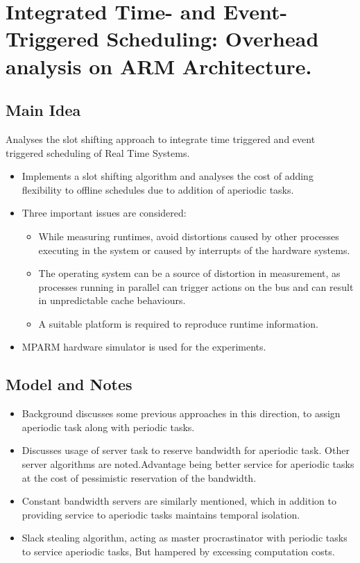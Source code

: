 \section{Integrated Time- and Event-Triggered Scheduling: Overhead analysis on ARM Architecture.}
\subsection*{Main Idea}
Analyses the slot shifting approach to integrate time triggered and event triggered scheduling of Real Time Systems.
\begin{itemize}
	\item Implements a slot shifting algorithm and analyses the cost of adding flexibility to offline schedules due to addition of aperiodic tasks.
	\item Three important issues are considered: 
	\begin{itemize}
		\item While measuring runtimes, avoid distortions caused by other processes executing in the system or caused by interrupts of the hardware systems.
		\item The operating system can be a source of distortion in measurement, as processes running in parallel can trigger actions on the bus and can result in unpredictable cache behaviours.
		\item A suitable platform is required to reproduce runtime information.
	\end{itemize}
	\item MPARM hardware simulator is used for the experiments.
\end{itemize}
\subsection*{Model and Notes}
\begin{itemize}
	\item Background discusses some previous approaches in this direction, to assign aperiodic task along with periodic tasks.
	\item Discusses usage of server task to reserve bandwidth for aperiodic task. Other server algorithms are noted.Advantage being better service for aperiodic tasks at the cost of pessimistic reservation of the bandwidth.
	\item Constant bandwidth servers are similarly mentioned, which in addition to providing service to aperiodic tasks maintains temporal isolation.
	\item Slack stealing algorithm, acting as master procrastinator with periodic tasks to service aperiodic tasks, But hampered by excessing computation costs.
\end{itemize}
